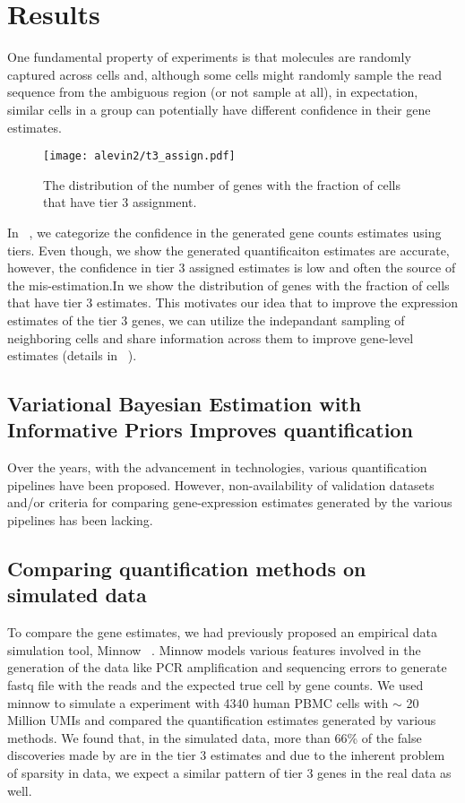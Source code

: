 \section{Results}
One fundamental property of \dscrnaseq experiments is that molecules are randomly captured across cells 
and, although some cells might randomly sample the read sequence from the ambiguous region 
(or not sample at all), in expectation, similar cells in a group can potentially have different 
confidence in their gene estimates. 

\begin{figure}[!htb]
	\centering
	\texttt{[image: alevin2/t3\_assign.pdf]}
	\caption{ The distribution of the number of genes with the fraction of cells that have tier 3
	assignment.}
	\label{fig:alv2_t3}
\end{figure}

In ~, we categorize the confidence in the generated gene counts estimates using tiers. 
Even though, we show the \alevin generated quantificaiton estimates are accurate, however, the confidence 
in tier 3 assigned estimates is low and often the source of the mis-estimation.In  we show the 
distribution of genes with the fraction of cells that have tier 3 estimates. This motivates our idea that to improve 
the expression estimates of the tier 3 genes, we can utilize the indepandant sampling of neighboring cells and share 
information across them to improve gene-level estimates (details in ~).

\subsection{Variational Bayesian Estimation with Informative Priors Improves \dscrnaseq quantification}
Over the years, with the advancement in \singlecell technologies, various \singlecell quantification 
pipelines have been proposed. However, non-availability of validation datasets and/or criteria for 
comparing gene-expression estimates generated by the various pipelines has been lacking. 

\subsection{Comparing quantification methods on simulated data}
\label{subsec:alv2_sims}

To compare the gene estimates, we had previously proposed an empirical \dscrnaseq data simulation tool, Minnow 
~\citep{sarkar2019minnow}. Minnow models various features involved in the generation of the \dscrnaseq data 
like PCR amplification and sequencing errors to generate fastq file with the reads and the expected true cell 
by gene counts. We used minnow to simulate a \dscrnaseq experiment with 4340 human PBMC cells with $\sim$ 
20 Million UMIs and compared the quantification estimates generated by various methods. We found that, 
in the simulated data, more than 66\% of the false discoveries made by \alevin are in the tier 3 estimates 
and due to the inherent problem of sparsity in \dscrnaseq data, we expect a similar pattern of tier 3 genes in 
the real data as well.

